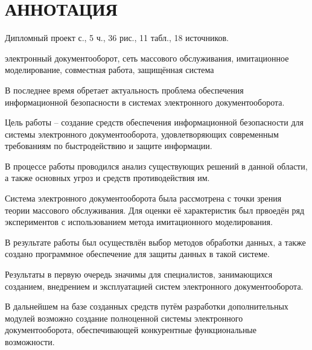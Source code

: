 \chapter*{АННОТАЦИЯ}							%

Дипломный проект \pageref*{LastPage} с., 5 ч., 36 рис., 11 табл., 18 источников.

\vspace{\baselineskip}
электронный документооборот, сеть массового обслуживания, имитационное моделирование, совместная работа, защищённая система

\vspace{\baselineskip}
В последнее время обретает актуальность проблема обеспечения информационной безопасности в системах электронного документооборота. 

Цель работы – создание средств обеспечения информационной безопасности для системы электронного документооборота, удовлетворяющих современным требованиям по быстродействию и защите информации.

В процессе работы проводился анализ существующих решений в данной области, а также основных угроз и средств противодействия им.

Система электронного документооборота была рассмотрена с точки зрения теории массового обслуживания. Для оценки её характеристик был првоедён ряд экспериментов с использованием метода имитационного моделирования.

В результате работы был осуществлён выбор методов обработки данных, а также создано программное обеспечение для защиты данных в такой системе.

Результаты в первую очередь значимы для специалистов, занимающихся созданием, внедрением и эксплуатацией систем электронного документооборота.

В дальнейшем на базе созданных средств путём разработки дополнительных модулей возможно создание полноценной системы электронного документооборота, обеспечивающей конкурентные функциональные возможности.

\clearpage